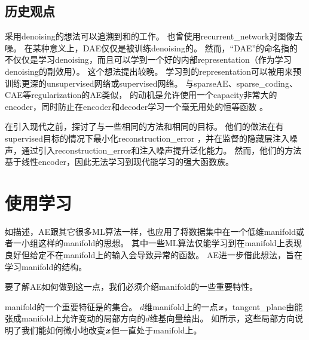 
\subsection{历史观点}
\label{sec:historical_perspective_chap14}
采用\gls{denoising}的想法可以追溯到\cite{Lecun-these87}和\citet{Gallinari87}的工作。
\citet{Behnke-2001}也曾使用\gls{recurrent_network}对图像去噪。
在某种意义上，\gls{DAE}仅仅是被训练\gls{denoising}的。
然而，``\gls{DAE}''的命名指的不仅仅是学习\gls{denoising}，而且可以学到一个好的内部\gls{representation}（作为学习\gls{denoising}的副效用）。
这个想法提出较晚\citep{VincentPLarochelleH2008-small,Vincent-JMLR-2010-small}。
学习到的\gls{representation}可以被用来预训练更深的\gls{unsupervised}网络或\gls{supervised}网络。
与\gls{sparse}\gls{AE}、\gls{sparse_coding}、\gls{CAE}等\gls{regularization}的\gls{AE}类似， 的动机是允许使用一个\gls{capacity}非常大的\gls{encoder}，同时防止在\gls{encoder}和\gls{decoder}学习一个毫无用处的恒等函数 。


在引入现代之前，\citet{Inayoshi-and-Kurita-2005}探讨了与一些相同的方法和相同的目标。
他们的做法在有\gls{supervised}目标的情况下最小化\gls{reconstruction_error} ，并在监督的隐藏层注入噪声，通过引入\gls{reconstruction_error}和注入噪声提升泛化能力。
然而，他们的方法基于线性\gls{encoder}，因此无法学习到现代能学习的强大函数族。



\section{使用学习}
\label{sec:learning_manifolds_with_autoencoders}

如描述，\gls{AE}跟其它很多\gls{ML}算法一样，也应用了将数据集中在一个低维\gls{manifold}或者一小组这样的\gls{manifold}的思想。
其中一些\gls{ML}算法仅能学习到在\gls{manifold}上表现良好但给定不在\gls{manifold}上的输入会导致异常的函数。
\gls{AE}进一步借此想法，旨在学习\gls{manifold}的结构。


要了解\gls{AE}如何做到这一点，我们必须介绍\gls{manifold}的一些重要特性。


\gls{manifold}的一个重要特征是的集合。
$d$维\gls{manifold}上的一点$\boldsymbol{\mathit{x}}$，\gls{tangent_plane}由能张成\gls{manifold}上允许变动的局部方向的$d$维基向量给出。
如所示，这些局部方向说明了我们能如何微小地改变$\boldsymbol{\mathit{x}}$但一直处于\gls{manifold}上。


